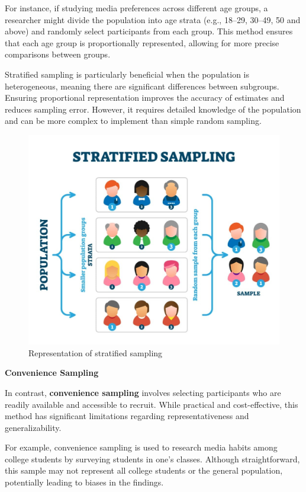 \documentclass[
]{book}
\begin{document}
For instance, if studying media preferences across different age groups, a researcher might divide the population into age strata (e.g., 18--29, 30--49, 50 and above) and randomly select participants from each group. This method ensures that each age group is proportionally represented, allowing for more precise comparisons between groups.

Stratified sampling is particularly beneficial when the population is heterogeneous, meaning there are significant differences between subgroups. Ensuring proportional representation improves the accuracy of estimates and reduces sampling error. However, it requires detailed knowledge of the population and can be more complex to implement than simple random sampling.

\begin{figure}
\centering
\includegraphics[width=1\linewidth,height=\textheight,keepaspectratio]{images/strata.jpg}
\caption{Representation of stratified sampling}
\end{figure}

\textbf{Convenience Sampling}

In contrast, \textbf{convenience sampling} involves selecting participants who are readily available and accessible to recruit. While practical and cost-effective, this method has significant limitations regarding representativeness and generalizability.

For example, convenience sampling is used to research media habits among college students by surveying students in one's classes. Although straightforward, this sample may not represent all college students or the general population, potentially leading to biases in the findings.
\end{document}
